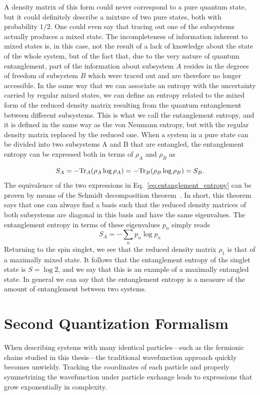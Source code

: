 \documentclass[12pt,oneside,openright]{report}
\theoremstyle{definition}
\theoremstyle{plain}
\theoremstyle{remark}
\begin{document}
A density matrix of this form could never correspond to a pure quantum state, but it could
definitely describe a mixture of two pure states, both with probability $1/2$.
One could even say
that tracing out one of the subsystems actually produces a mixed state. The incompleteness
of information inherent to mixed states is, in this case, not the result of a lack of knowledge
about the state of the whole system, but of the fact that, due to the very nature of quantum
entanglement, part of the information about subsystem $A$ resides in the degrees of freedom of
subsystem $B$ which were traced out and are therefore no longer accessible.
In the same way that we can associate an entropy with the uncertainty carried by regular
mixed states, we can define an entropy related to the mixed form of the reduced density matrix
resulting from the quantum entanglement between different subsystems. This is what we call
the entanglement entropy, and it is defined in the same way as the von Neumann entropy,
but with the regular density matrix replaced by the reduced one. When a system in
a pure state can be divided into two subsystems A and B that are entangled, the entanglement
entropy can be expressed both in terms of $\rho_A$ and $\rho_B$ as

\begin{equation}{\label{eq:entanglement_entropy}}
S_A = -\mathrm{Tr}_A(\rho_A \log \rho_A) = -\mathrm{Tr}_B(\rho_B \log \rho_B) = S_B.
\end{equation}
The equivalence of the two expressions in Eq.~\eqref{eq:entanglement_entropy} can be proven by means of the Schmidt
decomposition theorem~\cite{NielsenChuang}.
In short, this theorem says that one can always find a basis
such that the reduced density matrices of both subsystems are diagonal in this basis and have
the same eigenvalues. The entanglement entropy in terms of these eigenvalues $p_n$ simply reads
\begin{equation}
S_A = - \sum_{n} p_n \log p_n
\end{equation}
Returning to the spin singlet, we see that the reduced density matrix $\rho_1$ is that of a maximally mixed state. It follows
that the entanglement entropy of the singlet state is $S = \log 2$,
and we say that this is an example of
a maximally entangled state. In general we can say that the entanglement entropy is a measure
of the amount of entanglement between two systems.

\section{Second Quantization Formalism}
\label{sec:second_quantization}
When describing systems with many identical particles—such as the fermionic chains studied in this thesis—the traditional wavefunction approach quickly becomes unwieldy. Tracking the coordinates of each particle and properly symmetrizing the wavefunction under particle exchange leads to expressions that grow exponentially in complexity.
\end{document}

